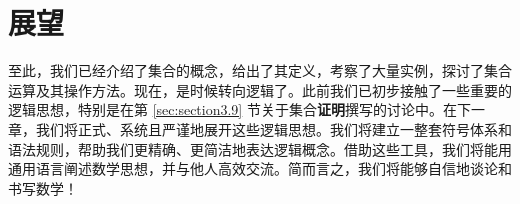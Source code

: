 \section{展望}

至此，我们已经介绍了集合的概念，给出了其定义，考察了大量实例，探讨了集合运算及其操作方法。现在，是时候转向逻辑了。此前我们已初步接触了一些重要的逻辑思想，特别是在第 \ref{sec:section3.9} 节关于集合\textbf{证明}撰写的讨论中。在下一章，我们将正式、系统且严谨地展开这些逻辑思想。我们将建立一整套符号体系和语法规则，帮助我们更精确、更简洁地表达逻辑概念。借助这些工具，我们将能用通用语言阐述数学思想，并与他人高效交流。简而言之，我们将能够自信地谈论和书写数学！